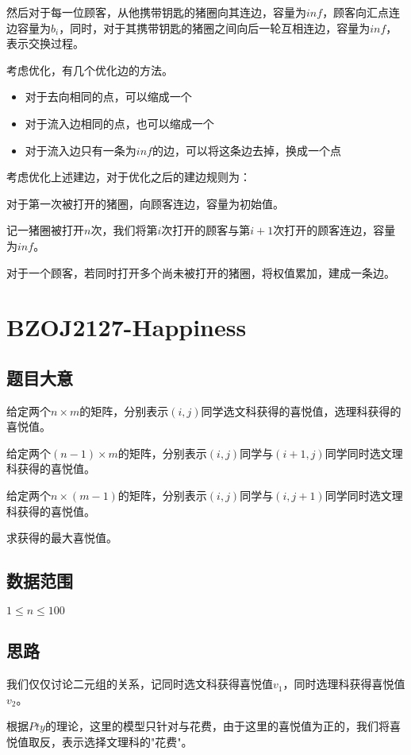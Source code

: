 \documentclass{ctexart}
\numberwithin{equation}{section}
\begin{document}
\begin{flushleft}
  然后对于每一位顾客，从他携带钥匙的猪圈向其连边，容量为$inf$，顾客向汇点连边容量为$b_i$，同时，对于其携带钥匙的猪圈之间向后一轮互相连边，容量为$inf$，表示交换过程。

  考虑优化，有几个优化边的方法。

  \begin{itemize}
  \item 对于去向相同的点，可以缩成一个
  \item 对于流入边相同的点，也可以缩成一个
  \item 对于流入边只有一条为$inf$的边，可以将这条边去掉，换成一个点
  \end{itemize}

  考虑优化上述建边，对于优化之后的建边规则为：

  对于第一次被打开的猪圈，向顾客连边，容量为初始值。

  记一猪圈被打开$n$次，我们将第$i$次打开的顾客与第$i+1$次打开的顾客连边，容量为$inf$。

  对于一个顾客，若同时打开多个尚未被打开的猪圈，将权值累加，建成一条边。

  \newpage

  \section{BZOJ2127-Happiness}
  \subsection{题目大意}
  给定两个$n\times m$的矩阵，分别表示$(i,j)$同学选文科获得的喜悦值，选理科获得的喜悦值。

  给定两个$(n-1)\times m$的矩阵，分别表示$(i,j)$同学与$(i+1,j)$同学同时选文理科获得的喜悦值。

  给定两个$n\times (m-1)$的矩阵，分别表示$(i,j)$同学与$(i,j+1)$同学同时选文理科获得的喜悦值。

  求获得的最大喜悦值。
  
  \subsection{数据范围}
  $1\le n \le 100$
  \subsection{思路}
  我们仅仅讨论二元组的关系，记同时选文科获得喜悦值$v_1$，同时选理科获得喜悦值$v_2$。

  根据$Pty$的理论，这里的模型只针对与花费，由于这里的喜悦值为正的，我们将喜悦值取反，表示选择文理科的"花费"。


\end{flushleft}
\end{document}
